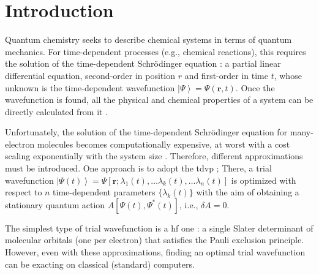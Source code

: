 \documentclass{aux/ttuthes2007}
\newcommand{\ket}[1]{\ensuremath{\left|#1\right\rangle}}
\begin{document}

\listoffigures	%




\mainmatter


%
\chapter{\textbf{Introduction}}

Quantum chemistry  seeks to describe chemical systems in terms of quantum mechanics.
For time-dependent processes (e.g., chemical reactions), this requires the solution of the time-dependent Schrödinger equation : a partial linear differential equation, second-order in position $r$ and first-order in time $t$, whose unknown is the time-dependent wavefunction $\ket \Psi = \Psi(\bm r, t)$.
Once the wavefunction is found, all the physical and chemical properties of a system can be directly calculated from it .

Unfortunately, the solution of the time-dependent Schrödinger equation for many-electron molecules becomes computationally expensive, at worst with a cost scaling exponentially with the system size .
Therefore, different approximations must be introduced.
One approach is to adopt the \gls{tdvp} ;
There, a trial wavefunction $\ket {\Psi(t)} = \Psi\left[\bm r; \lambda_1(t), \ldots \lambda_k(t), \ldots \lambda_n(t) \right ]$ is optimized with respect to $n$ time-dependent parameters $\{\lambda_k(t)\}$ with the aim of obtaining a stationary quantum action $A \left[ \Psi(t), \Psi^*(t) \right ] $, i.e., $\delta A = 0$.

The simplest type of trial wavefunction is a \gls{hf} one :
a single Slater determinant of molecular orbitals (one per electron) that satisfies the Pauli exclusion principle.
However, even with these approximations, finding an optimal trial wavefunction can be exacting on classical (standard) computers.
\end{document}
